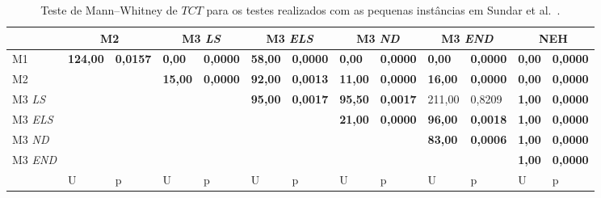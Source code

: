 \begin{table}[H]
\caption{Teste de Mann–Whitney de $TCT$ para os testes realizados com as pequenas instâncias em Sundar et al.~\cite{sundarHybridArtificialBee2017}.}
\label{tab:P1_hipothesis_TCT}
\setlength{\tabcolsep}{3pt} %
\begin{tabular}{l|ll|ll|ll|ll|ll|ll}
                       & \multicolumn{2}{c|}{M2}            & \multicolumn{2}{c|}{M3 \textit{LS}} & \multicolumn{2}{c|}{M3 \textit{ELS}} & \multicolumn{2}{c|}{M3 \textit{ND}} & \multicolumn{2}{c|}{M3 \textit{END}} & \multicolumn{2}{c}{NEH}          \\ \hline
M1                               & \textbf{124,00} & \textbf{0,0157} & \textbf{0,00}            & \textbf{0,0000}          & \textbf{58,00}           & \textbf{0,0000}           & \textbf{0,00}            & \textbf{0,0000}          & \textbf{0,00}            & \textbf{0,0000}           & \textbf{0,00} & \textbf{0,0000} \\
M2                               & \textbf{}       & \textbf{}       & \textbf{15,00}           & \textbf{0,0000}          & \textbf{92,00}           & \textbf{0,0013}           & \textbf{11,00}           & \textbf{0,0000}          & \textbf{16,00}           & \textbf{0,0000}           & \textbf{0,00} & \textbf{0,0000} \\
M3 \textit{LS}  & \textbf{}       & \textbf{}       & \textbf{}                & \textbf{}                & \textbf{95,00}           & \textbf{0,0017}           & \textbf{95,50}           & \textbf{0,0017}          & 211,00                   & 0,8209                    & \textbf{1,00} & \textbf{0,0000} \\
M3 \textit{ELS} & \textbf{}       & \textbf{}       & \textbf{}                & \textbf{}                & \textbf{}                & \textbf{}                 & \textbf{21,00}           & \textbf{0,0000}          & \textbf{96,00}           & \textbf{0,0018}           & \textbf{1,00} & \textbf{0,0000} \\
M3 \textit{ND}  & \textbf{}       & \textbf{}       & \textbf{}                & \textbf{}                & \textbf{}                & \textbf{}                 & \textbf{}                & \textbf{}                & \textbf{83,00}           & \textbf{0,0006}           & \textbf{1,00} & \textbf{0,0000} \\
M3 \textit{END} & \textbf{}       & \textbf{}       & \textbf{}                & \textbf{}                & \textbf{}                & \textbf{}                 & \textbf{}                & \textbf{}                & \textbf{}                & \textbf{}                 & \textbf{1,00} & \textbf{0,0000} \\ \hline
                                 & U               & p               & U                        & p                        & U                        & p                         & U                        & p                        & U                        & p                         & U             & p              
\end{tabular}
\end{table}

